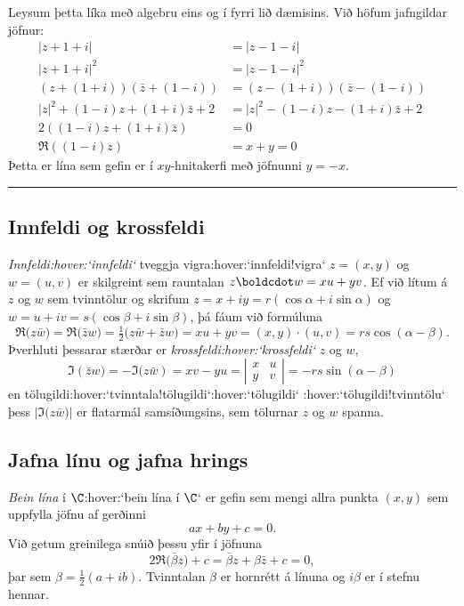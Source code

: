 Leysum þetta líka með algebru eins og í fyrri lið dæmisins.
Við höfum jafngildar jöfnur:
\begin{align*}
|z+1+i|&=|z-1-i| \\
|z+1+i|^2&=|z-1-i|^2 \\
(z+(1+i))(\bar z+(1-i))&=(z-(1+i))(\bar
z-(1-i)) \\
|z|^2+(1-i)z+(1+i)\bar z+2&=|z|^2-(1-i)z-(1+i)\bar z+2\\
2((1-i)z+(1+i)\bar z)&=0\\
\Re ((1-i)z)&=x+y=0
\end{align*} 
Þetta er lína sem gefin er í $xy$-hnitakerfi með jöfnunni
$y=-x$.


\bigskip\hrule\bigskip

\subsection*{Innfeldi og krossfeldi}

{\it Innfeldi:hover:`innfeldi`} tveggja vigra:hover:`innfeldi!vigra`
$z=(x,y)$ og $w=(u,v)$ er 
skilgreint sem rauntalan $z\boldcdot w=xu+yv$.
Ef við lítum á $z$ og $w$ sem tvinntölur og skrifum
$z=x+iy=r(\cos\alpha+i\sin \alpha)$ og
$w=u+iv=s(\cos\beta+i\sin\beta)$, þá fáum við formúluna
$$
\Re\big(z\bar w\big)=\Re\big(\bar z w\big)
=\tfrac 12\big(z\bar w+\bar z w\big)=xu+yv=(x,y)\cdot(u,v)=rs\cos(\alpha-\beta).
$$
Þverhluti þessarar stærðar er {\it krossfeldi:hover:`krossfeldi`} $z$ og $w$, 
$$
\Im(\bar z w\big)=-\Im\big(z\bar w)=xv-yu=\left|\begin{matrix}
 x&u  \\
 y&v 
\end{matrix}\right|=-rs\sin(\alpha-\beta)
$$
en tölugildi:hover:`tvinntala!tölugildi`:hover:`tölugildi`
:hover:`tölugildi!tvinntölu` þess $|\Im\big(z\bar w)|$ er flatarmál
samsíðungsins, sem tölurnar $z$ og $w$ spanna.  


\subsection*{Jafna línu og jafna hrings}

{\it Bein lína} í $\C$:hover:`bein lína í $\C$` er gefin sem mengi allra punkta $(x,y)$
sem uppfylla jöfnu af gerðinni
$$
ax+by+c=0.
$$
Við getum greinilega snúið þessu yfir í jöfnuna 
$$
2\Re\big( \bar {\beta} z\big)+c=\bar {\beta} z+{\beta}\bar z+c=0,
$$
þar sem ${\beta}=\frac 12(a+ib)$.  Tvinntalan ${\beta}$ er hornrétt á
línuna og $i{\beta}$ er í stefnu hennar. 



